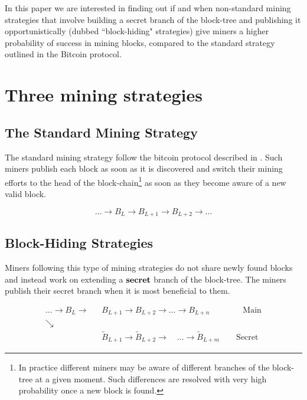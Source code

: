 \documentclass[letterpaper,12pt]{report}
\begin{document}
In this paper we are interested in finding out if and when non-standard mining strategies that involve building a secret branch of the block-tree and publishing it opportunistically (dubbed ``block-hiding" strategies) give miners a higher probability of success in mining blocks, compared to the standard strategy outlined in the Bitcoin protocol.

\chapter{Three mining strategies}\label{chap:strategies}

\section{The Standard Mining Strategy}
The standard mining strategy follow the bitcoin protocol described in \cite{Bitcoin}. Such miners publish each block as soon as it is discovered and switch their mining efforts to the head of the block-chain\footnote{In practice different miners may be aware of different branches of the block-tree at a given moment. Such differences are resolved with very high probability once a new block is found.} as soon as they become aware of a new valid block.

\begin{equation}\label{theblockchain}\nonumber
\dots\rightarrow\mathit{B}_L\rightarrow\mathit{B}_{L+1}\rightarrow\mathit{B}_{L+2}\rightarrow\dots
\end{equation}

\section{Block-Hiding Strategies}
Miners following this type of mining strategies do not share newly found blocks and instead work on extending a $\bf{secret}$ branch of the block-tree. The miners publish their secret branch when it is most beneficial to them. 

\begin{eqnarray}\label{fig:blockhidingchain}
 \dots \rightarrow \mathit{B}_L\rightarrow &\mathit{B}_{L+1}\rightarrow\mathit{B}_{L+2}
\rightarrow\dots\rightarrow\mathit{B}_{L+n} \qquad\qquad \mathrm{Main}\\\nonumber
\searrow & \\\nonumber
\qquad \qquad \qquad & \widetilde{\mathit{B}}_{L+1}\rightarrow\widetilde{\mathit{B}}_{L+2}
\longrightarrow \quad \dots \longrightarrow\widetilde{\mathit{B}}_{L+m}\qquad \mathrm{Secret}
\end{eqnarray}
\end{document}
